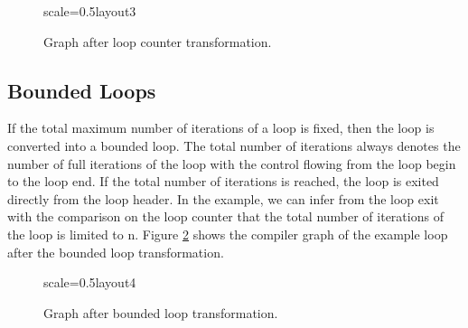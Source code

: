 \documentclass[twocolumn]{svjour3}
\begin{document}
\begin{figure}[ht]
  \centering
\begin{digraphenv}{scale=0.5}{layout3}
\end{digraphenv}
  \caption{Graph after loop counter transformation.}
  \label{fig:loop3}
\end{figure}

\subsection{Bounded Loops}

If the total maximum number of iterations of a loop is fixed, then the loop is converted into a bounded loop.
The total number of iterations always denotes the number of full iterations of the loop with the control flowing from the loop begin to the loop end.
If the total number of iterations is reached, the loop is exited directly from the loop header.
In the example, we can infer from the loop exit with the comparison on the loop counter that the total number of iterations of the loop is limited to n.
Figure \ref{fig:loop4} shows the compiler graph of the example loop after the bounded loop transformation.

\begin{figure}[ht]
  \centering
\begin{digraphenv}{scale=0.5}{layout4}
\end{digraphenv}
  \caption{Graph after bounded loop transformation.}
  \label{fig:loop4}
\end{figure}
\end{document}
